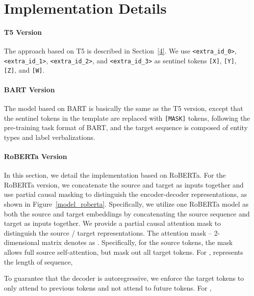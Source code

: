 \documentclass[11pt]{article}
\begin{document}
\section{Implementation Details}\label{B}
\paragraph{T5 Version}
The approach based on T5 is described in Section~\ref{4}. We use \texttt{<extra\_id\_0>}, \texttt{<extra\_id\_1>}, \texttt{<extra\_id\_2>}, and \texttt{<extra\_id\_3>} as sentinel tokens \texttt{[X]}, \texttt{[Y]}, \texttt{[Z]}, and \texttt{[W]}.
\paragraph{BART Version}
The model based on BART is basically the same as the T5 version, except that the sentinel tokens in the template are replaced with \texttt{[MASK]} tokens, following the pre-training task format of BART, and the target sequence is composed of entity types and label verbalizations.
\paragraph{RoBERTa Version}
In this section, we detail the implementation based on RoBERTa.
For the RoBERTa version, we concatenate the source and target as inputs together and use partial causal masking to distinguish the encoder-decoder representations,
as shown in Figure~\ref{model_roberta}. Specifically, we utilize one RoBERTa model as both the source and target embeddings by concatenating the source sequence  and target  as inputs together. We provide a partial causal attention mask to distinguish the source / target representations. The attention mask – 2-dimensional matrix denotes as . Specifically, for the source tokens, the mask allows full source self-attention, but mask out all target tokens. For ,  represents the length of sequence, 



To guarantee that the decoder is autoregressive, we enforce the target tokens to only attend to previous tokens and not attend to future tokens. 
For , 

\begin{table}
	\centering
	\caption{Statistics of datasets used.}
	\label{data}
\end{table}
\end{document}
